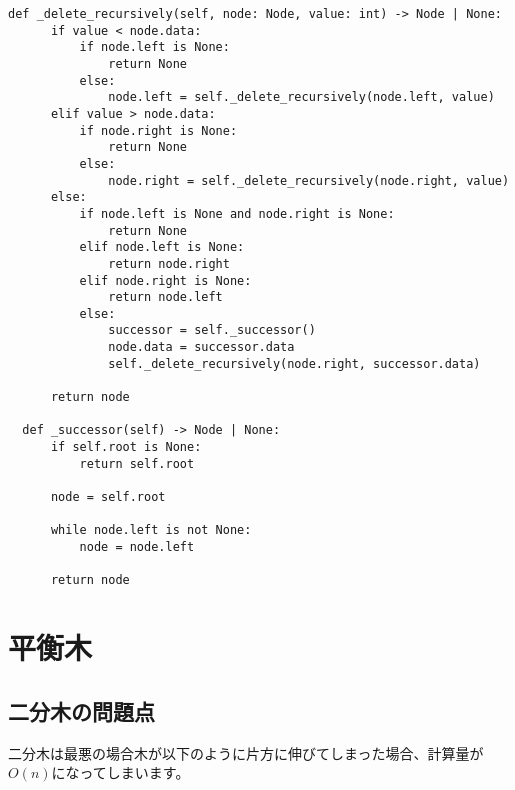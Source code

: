 \documentclass{jlreq}
\begin{document}
\begin{lstlisting}[caption=二分木の実装, frame=TRBL, label={binary_tree}]
  def _delete_recursively(self, node: Node, value: int) -> Node | None:
      if value < node.data:
          if node.left is None:
              return None
          else:
              node.left = self._delete_recursively(node.left, value)
      elif value > node.data:
          if node.right is None:
              return None
          else:
              node.right = self._delete_recursively(node.right, value)
      else:
          if node.left is None and node.right is None:
              return None
          elif node.left is None:
              return node.right
          elif node.right is None:
              return node.left
          else:
              successor = self._successor()
              node.data = successor.data
              self._delete_recursively(node.right, successor.data)
              
      return node
  
  def _successor(self) -> Node | None:
      if self.root is None:
          return self.root
      
      node = self.root
      
      while node.left is not None:
          node = node.left
      
      return node
\end{lstlisting}

\newpage

\section{平衡木}
\subsection{二分木の問題点}
二分木は最悪の場合木が以下のように片方に伸びてしまった場合、計算量が$O(n)$になってしまいます。

\vspace{0.5cm}

\begin{center}
\end{center}
\end{document}
